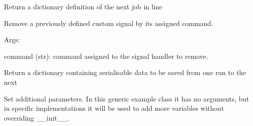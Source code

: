 \documentclass[letterpaper,10pt,english]{sphinxmanual}
\begin{document}
\begin{fulllineitems}

\begin{fulllineitems}
\label{doctree/soprano.hpc.submitter.submit:soprano.hpc.submitter.submit.Submitter.next_job}
Return a dictionary definition of the next job in line

\end{fulllineitems}


\begin{fulllineitems}
\label{doctree/soprano.hpc.submitter.submit:soprano.hpc.submitter.submit.Submitter.remove_signal}
Remove a previously defined custom signal by its assigned command.

\begin{DUlineblock}{0em}
\item[] Args:
\item[]
\begin{DUlineblock}{\DUlineblockindent}
\item[] command (str): command assigned to the signal handler to remove.
\end{DUlineblock}
\end{DUlineblock}

\end{fulllineitems}


\begin{fulllineitems}
\label{doctree/soprano.hpc.submitter.submit:soprano.hpc.submitter.submit.Submitter.save_state}
Return a dictionary containing serialisable data to be saved from
one run to the next

\end{fulllineitems}


\begin{fulllineitems}
\label{doctree/soprano.hpc.submitter.submit:soprano.hpc.submitter.submit.Submitter.set_parameters}
Set additional parameters. In this generic example class it has
no arguments, but in specific implementations it will be used to
add more variables without overriding \_\_init\_\_.


\end{fulllineitems}
\end{fulllineitems}
\end{document}
